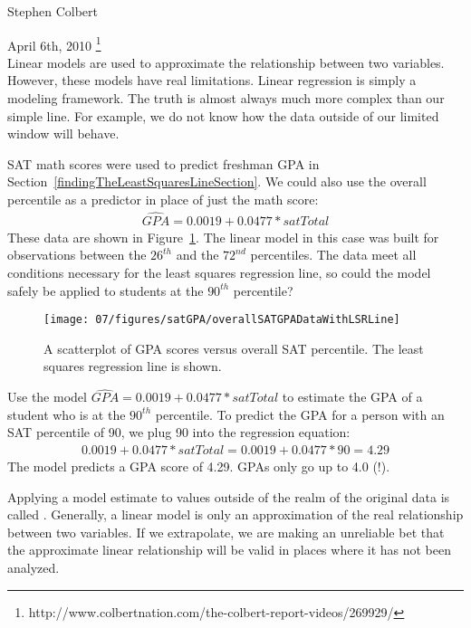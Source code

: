 \noindent\hspace{\textwidth}\hspace{-40mm}Stephen Colbert

\noindent\hspace{\textwidth}\hspace{-40mm}April 6th, 2010 \footnote{http://www.colbertnation.com/the-colbert-report-videos/269929/} \\

Linear models are used to approximate the relationship between two variables. However, these models have real limitations. Linear regression is simply a modeling framework. The truth is almost always much more complex than our simple line. For example, we do not know how the data outside of our limited window will behave.

SAT math scores were used to predict freshman GPA in Section~\ref{findingTheLeastSquaresLineSection}. We could also use the overall percentile as a predictor in place of just the math score:
\begin{align*}
\widehat{GPA} = 0.0019 + 0.0477*satTotal
\end{align*}
These data are shown in Figure~\ref{overallSATGPADataWithLSRLine}. The linear model in this case was built for observations between the $26^{th}$ and the $72^{nd}$ percentiles. The data meet all conditions necessary for the least squares regression line, so could the model safely be applied to students at the $90^{th}$ percentile?
\begin{figure}
\centering
\texttt{[image: 07/figures/satGPA/overallSATGPADataWithLSRLine]}
\caption{A scatterplot of GPA scores versus overall SAT percentile. The least squares regression line is shown.}
\label{overallSATGPADataWithLSRLine}
\end{figure}

\begin{example}{Use the model $\widehat{GPA} = 0.0019 + 0.0477*satTotal$ to estimate the GPA of a student who is at the $90^{th}$ percentile.}
To predict the GPA for a person with an SAT percentile of 90, we plug 90 into the regression equation:
\begin{align*}
0.0019 + 0.0477*satTotal  = 0.0019 + 0.0477*90 = 4.29
\end{align*}
The model predicts a GPA score of 4.29. GPAs only go up to 4.0 (!).
\end{example}

Applying a model estimate to values outside of the realm of the original data is called . Generally, a linear model is only an approximation of the real relationship between two variables. If we extrapolate, we are making an unreliable bet that the approximate linear relationship will be valid in places where it has not been analyzed.

